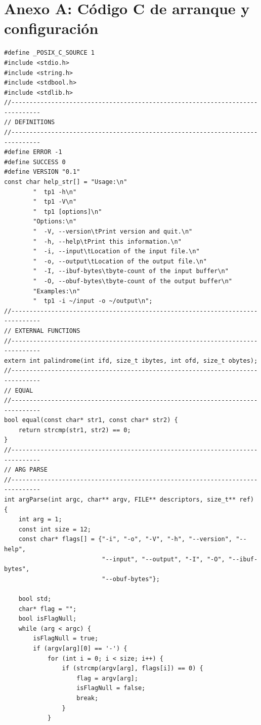 \documentclass[a4paper,10pt]{article}
\begin{document}
    \newpage
    
    \section{Anexo A: Código C de arranque y configuración}
        \begin{lstlisting}
#define _POSIX_C_SOURCE 1
#include <stdio.h>
#include <string.h>
#include <stdbool.h>
#include <stdlib.h>
//------------------------------------------------------------------------------
// DEFINITIONS
//------------------------------------------------------------------------------
#define ERROR -1
#define SUCCESS 0
#define VERSION "0.1"
const char help_str[] = "Usage:\n"
        "  tp1 -h\n"
        "  tp1 -V\n"
        "  tp1 [options]\n"
        "Options:\n"
        "  -V, --version\tPrint version and quit.\n"
        "  -h, --help\tPrint this information.\n"
        "  -i, --input\tLocation of the input file.\n"
        "  -o, --output\tLocation of the output file.\n"
        "  -I, --ibuf-bytes\tbyte-count of the input buffer\n"
        "  -O, --obuf-bytes\tbyte-count of the output buffer\n"
        "Examples:\n"
        "  tp1 -i ~/input -o ~/output\n";
//------------------------------------------------------------------------------
// EXTERNAL FUNCTIONS
//------------------------------------------------------------------------------
extern int palindrome(int ifd, size_t ibytes, int ofd, size_t obytes);
//------------------------------------------------------------------------------
// EQUAL
//------------------------------------------------------------------------------
bool equal(const char* str1, const char* str2) {
    return strcmp(str1, str2) == 0;
}
//------------------------------------------------------------------------------
// ARG PARSE
//------------------------------------------------------------------------------
int argParse(int argc, char** argv, FILE** descriptors, size_t** ref) {
    int arg = 1;
    const int size = 12;
    const char* flags[] = {"-i", "-o", "-V", "-h", "--version", "--help",
                           "--input", "--output", "-I", "-O", "--ibuf-bytes",
                           "--obuf-bytes"};

    bool std;
    char* flag = "";
    bool isFlagNull;
    while (arg < argc) {
        isFlagNull = true;
        if (argv[arg][0] == '-') {
            for (int i = 0; i < size; i++) {
                if (strcmp(argv[arg], flags[i]) == 0) {
                    flag = argv[arg];
                    isFlagNull = false;
                    break;
                }
            }


\end{lstlisting}
\end{document}
